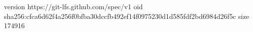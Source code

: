 version https://git-lfs.github.com/spec/v1
oid sha256:cfca6d62f4a256f0bfba30dccfb492ef14f0975230d1d585fdf2bd6984d26f5c
size 174916
